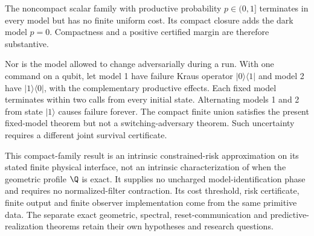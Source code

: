 \begin{example}\label{ex:compact-limits}
The noncompact scalar family with productive probability $p\in(0,1]$ terminates in every model but has no finite uniform cost. Its compact closure adds the dark model $p=0$. Compactness and a positive certified margin are therefore substantive.

Nor is the model allowed to change adversarially during a run. With one command on a qubit, let model 1 have failure Kraus operator $|0\rangle\langle1|$ and model 2 have $|1\rangle\langle0|$, with the complementary productive effects. Each fixed model terminates within two calls from every initial state. Alternating models 1 and 2 from state $|1\rangle$ causes failure forever. The compact finite union satisfies the present fixed-model theorem but not a switching-adversary theorem. Such uncertainty requires a different joint survival certificate.
\end{example}

This compact-family result is an intrinsic constrained-risk approximation on its stated finite physical interface, not an intrinsic characterization of when the geometric profile $\Q$ is exact. It supplies no uncharged model-identification phase and requires no normalized-filter contraction. Its cost threshold, risk certificate, finite output and finite observer implementation come from the same primitive data. The separate exact geometric, spectral, reset-communication and predictive-realization theorems retain their own hypotheses and research questions.
